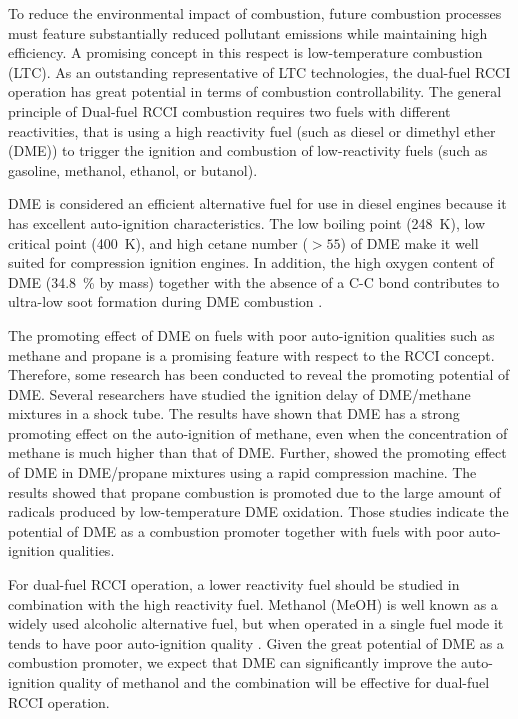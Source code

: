 \documentclass[12pt]{../ussci}
\begin{document}
To reduce the environmental impact of combustion, future combustion processes
must feature substantially reduced pollutant emissions while maintaining high
efficiency. A promising concept in this respect is low-temperature combustion
(LTC). As an outstanding representative of LTC technologies, the dual-fuel RCCI
operation has great potential in terms of combustion controllability. The
general principle of Dual-fuel RCCI combustion requires two fuels with different
reactivities, that is using a high reactivity fuel (such as diesel or dimethyl
ether (DME)) to trigger the ignition and combustion of low-reactivity fuels
(such as gasoline, methanol, ethanol, or butanol).

DME is considered an efficient alternative fuel for use in diesel engines
because it has excellent auto-ignition characteristics. The low boiling point
(\SI{248}{\K}), low critical point (\SI{400}{\K}), and high cetane number (\(>
55\)) of DME \autocite{Arcoumanis2008,Teng2001} make it well suited for
compression ignition engines. In addition, the high oxygen content of DME
(\SI{34.8}{\percent} by mass) together with the absence of a C-C bond
contributes to ultra-low soot formation during DME combustion
\autocite{Arcoumanis2008}.

The promoting effect of DME on fuels with poor auto-ignition qualities such as
methane and propane is a promising feature with respect to the RCCI concept.
Therefore, some research has been conducted to reveal the promoting potential of
DME. Several researchers \autocite{Burke2015a,Tang2012a,Chen2007a} have studied
the ignition delay of DME/methane mixtures in a shock tube. The results have
shown that DME has a strong promoting effect on the auto-ignition of methane,
even when the concentration of methane is much higher than that of DME. Further,
\textcite{Dames2016} showed the promoting effect of DME in DME/propane mixtures
using a rapid compression machine. The results showed that propane combustion is
promoted due to the large amount of radicals produced by low-temperature DME
oxidation. Those studies indicate the potential of DME as a combustion promoter
together with fuels with poor auto-ignition qualities.

For dual-fuel RCCI operation, a lower reactivity fuel should be studied in
combination with the high reactivity fuel. Methanol (MeOH) is well known as a
widely used alcoholic alternative fuel, but when operated in a single fuel mode
it tends to have poor auto-ignition quality \autocite{Siebers1987}. Given the
great potential of DME as a combustion promoter, we expect that DME can
significantly improve the auto-ignition quality of methanol and the combination
will be effective for dual-fuel RCCI operation.
\end{document}
